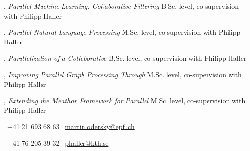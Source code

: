 \documentclass[9pt]{article}
\begin{document}
, {\em Parallel Machine Learning: Collaborative Filtering} 
\newline{}
\newline\noindent B.Sc. level, co-supervision with Philipp Haller
\medskip

, {\em Parallel Natural Language Processing} 
\newline{}
\newline\noindent M.Sc. level, co-supervision with Philipp Haller
\medskip

, {\em Parallelization of a Collaborative} 
\newline{}
\newline\noindent B.Sc. level, co-supervision with Philipp Haller
\medskip

, {\em Improving Parallel Graph Processing Through} 
\newline{}
\newline\noindent M.Sc. level, co-supervision with Philipp Haller
\medskip

, {\em Extending the Menthor Framework for Parallel} 
\newline{}
\newline\noindent M.Sc. level, co-supervision with Philipp Haller
\medskip

\pagebreak
\medskip
{}

\newline{}
\newline{}
\newline\noindent \Telefon~+41 21 693 68 63
\newline\noindent \Letter~\href{mailto:martin.odersky@epfl.ch}{martin.odersky@epfl.ch}
\medskip

\newline{}
\newline{}
\newline\noindent \Telefon~+41 76 205 39 32
\newline\noindent \Letter~\href{mailto:phaller@kth.se}{phaller@kth.se}
\medskip
\end{document}
